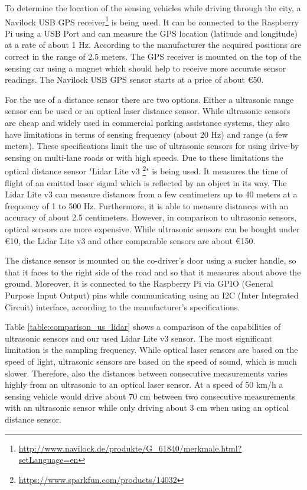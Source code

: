 To determine the location of the sensing vehicles while driving through the city, a Navilock USB GPS receiver\footnote{\url{http://www.navilock.de/produkte/G_61840/merkmale.html?setLanguage=en}} is being used. It can be connected to the Raspberry Pi using a USB Port and can measure the GPS location (latitude and longitude) at a rate of about 1 Hz. According to the manufacturer the acquired positions are correct in the range of 2.5 meters. The GPS receiver is mounted on the top of the sensing car using a magnet which should help to receive more accurate sensor readings. The Navilock USB GPS sensor starts at a price of about \euro{50}.

For the use of a distance sensor there are two options. Either a ultrasonic range sensor can be used or an optical laser distance sensor. While ultrasonic sensors are cheap and widely used in commercial parking assistance systems, they also have limitations in terms of sensing frequency (about 20 Hz) and range (a few meters). These specifications limit the use of ultrasonic sensors for using drive-by sensing on multi-lane roads or with high speeds. Due to these limitations the optical distance sensor "Lidar Lite v3 \footnote{\url{https://www.sparkfun.com/products/14032}}" is being used. It measures the time of flight of an emitted laser signal which is reflected by an object in its way. The Lidar Lite v3 can measure distances from a few centimeters up to 40 meters at a frequency of 1 to 500 Hz. Furthermore, it is able to measure distances with an accuracy of about 2.5 centimeters. However, in comparison to ultrasonic sensors, optical sensors are more expensive. While ultrasonic sensors can be bought under \euro{10}, the Lidar Lite v3 and other comparable sensors are about \euro{150}.

The distance sensor is mounted on the co-driver's door using a sucker handle, so that it faces to the right side of the road and so that it measures about \todo{40cm} above the ground. Moreover, it is connected to the Raspberry Pi via GPIO (General Purpose Input Output) pins while communicating using an I2C (Inter Integrated Circuit) interface, according to the manufacturer's specifications.

Table \ref{table:comparison_us_lidar} shows a comparison of the capabilities of ultrasonic sensors and our used Lidar Lite v3 sensor. The most significant limitation is the sampling frequency. While optical laser sensors are based on the speed of light, ultrasonic sensors are based on the speed of sound, which is much slower. Therefore, also the distances between consecutive measurements varies highly from an ultrasonic to an optical laser sensor. At a speed of 50 km/h a sensing vehicle would drive about 70 cm between two consecutive measurements with an ultrasonic sensor while only driving about 3 cm when using an optical distance sensor.



